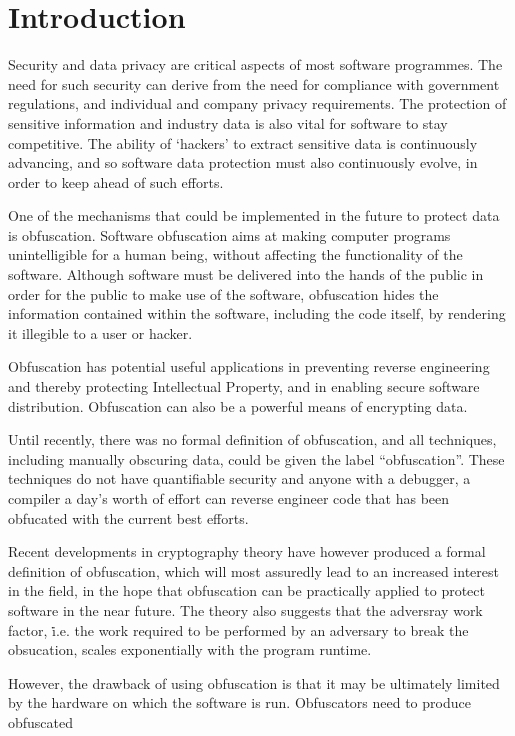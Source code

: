 \section{Introduction}
Security and data privacy are critical aspects of most software programmes. The
need for such security can derive from the need for compliance with government
regulations, and individual and company privacy requirements. The protection of
sensitive information and industry data is also vital for software to stay
competitive. The ability of ‘hackers’ to extract sensitive data is continuously
advancing, and so software data protection must also continuously evolve, in
order to keep ahead of such efforts.
\par
One of the mechanisms that could be implemented in the future to protect data is
obfuscation. Software obfuscation aims at making computer programs unintelligible
for a human being, without affecting the functionality of the software. Although
software must be delivered into the hands of the public in order for the public
to make use of the software, obfuscation hides the information contained within
the software, including the code itself, by rendering it illegible to a user or
hacker.
\par
Obfuscation has potential useful applications in preventing reverse engineering
and thereby protecting Intellectual Property, and in enabling secure software
distribution. Obfuscation can also be a powerful means of encrypting data.
\par
Until recently, there was no formal definition of obfuscation, and all techniques,
including manually obscuring data, could be given the label “obfuscation”. These
techniques do not have quantifiable security and anyone with a debugger, a compiler
a day's worth of effort can reverse engineer code that has been obfucated with the
current best efforts\cite{Hsieh}.
\par
Recent developments in cryptography theory have however produced a formal definition of
obfuscation, which will most assuredly lead to an increased interest in the field,
in the hope that obfuscation can be practically applied to protect software in the
near future. The theory also suggests that the adversray work factor, \.i.e. the
work required to be performed by an adversary to break the obsucation, scales exponentially
with the program runtime.\cite{Hsieh}
\par
However, the drawback of using obfuscation is that it may be ultimately limited
by the hardware on which the software is run. Obfuscators need to produce obfuscated

